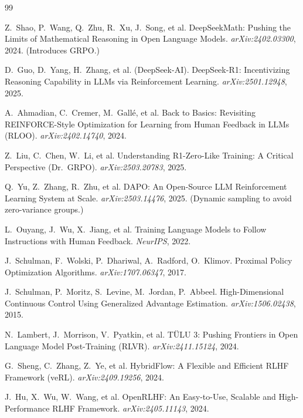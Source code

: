 \documentclass[11pt,a4paper]{article}
\begin{document}
\begin{thebibliography}{99}
\small

Z.~Shao, P.~Wang, Q.~Zhu, R.~Xu, J.~Song, et al.
\newblock DeepSeekMath: Pushing the Limits of Mathematical Reasoning in Open Language Models.
\newblock \emph{arXiv:2402.03300}, 2024. (Introduces GRPO.)

D.~Guo, D.~Yang, H.~Zhang, et al. (DeepSeek-AI).
\newblock DeepSeek-R1: Incentivizing Reasoning Capability in LLMs via Reinforcement Learning.
\newblock \emph{arXiv:2501.12948}, 2025.

A.~Ahmadian, C.~Cremer, M.~Gall\'e, et al.
\newblock Back to Basics: Revisiting REINFORCE-Style Optimization for Learning from Human Feedback in LLMs (RLOO).
\newblock \emph{arXiv:2402.14740}, 2024.

Z.~Liu, C.~Chen, W.~Li, et al.
\newblock Understanding R1-Zero-Like Training: A Critical Perspective (Dr.\ GRPO).
\newblock \emph{arXiv:2503.20783}, 2025.

Q.~Yu, Z.~Zhang, R.~Zhu, et al.
\newblock DAPO: An Open-Source LLM Reinforcement Learning System at Scale.
\newblock \emph{arXiv:2503.14476}, 2025. (Dynamic sampling to avoid zero-variance groups.)

L.~Ouyang, J.~Wu, X.~Jiang, et al.
\newblock Training Language Models to Follow Instructions with Human Feedback.
\newblock \emph{NeurIPS}, 2022.

J.~Schulman, F.~Wolski, P.~Dhariwal, A.~Radford, O.~Klimov.
\newblock Proximal Policy Optimization Algorithms.
\newblock \emph{arXiv:1707.06347}, 2017.

J.~Schulman, P.~Moritz, S.~Levine, M.~Jordan, P.~Abbeel.
\newblock High-Dimensional Continuous Control Using Generalized Advantage Estimation.
\newblock \emph{arXiv:1506.02438}, 2015.

N.~Lambert, J.~Morrison, V.~Pyatkin, et al.
\newblock T\"ULU 3: Pushing Frontiers in Open Language Model Post-Training (RLVR).
\newblock \emph{arXiv:2411.15124}, 2024.

G.~Sheng, C.~Zhang, Z.~Ye, et al.
\newblock HybridFlow: A Flexible and Efficient RLHF Framework (veRL).
\newblock \emph{arXiv:2409.19256}, 2024.

J.~Hu, X.~Wu, W.~Wang, et al.
\newblock OpenRLHF: An Easy-to-Use, Scalable and High-Performance RLHF Framework.
\newblock \emph{arXiv:2405.11143}, 2024.


\end{thebibliography}
\end{document}

